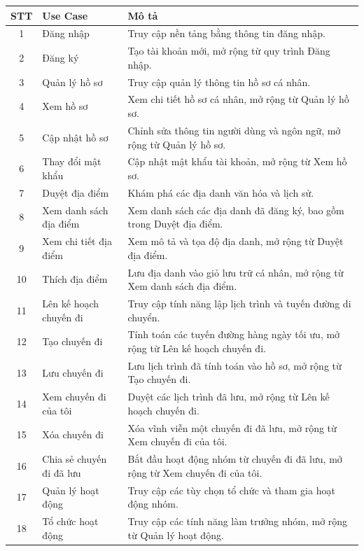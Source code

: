\documentclass[a4paper,12pt]{report}
\begin{document}
\newpage
\begin{table}[H]
\centering
\small
\renewcommand{\arraystretch}{1.1}
\begin{tabular}{|c|p{4.5cm}|p{9cm}|}
\hline
\textbf{STT} & \textbf{Use Case} & \textbf{Mô tả} \\ \hline
1 & Đăng nhập & Truy cập nền tảng bằng thông tin đăng nhập. \\ \hline
2 & Đăng ký & Tạo tài khoản mới, mở rộng từ quy trình Đăng nhập. \\ \hline
3 & Quản lý hồ sơ & Truy cập quản lý thông tin hồ sơ cá nhân. \\ \hline
4 & Xem hồ sơ & Xem chi tiết hồ sơ cá nhân, mở rộng từ Quản lý hồ sơ. \\ \hline
5 & Cập nhật hồ sơ & Chỉnh sửa thông tin người dùng và ngôn ngữ, mở rộng từ Quản lý hồ sơ. \\ \hline
6 & Thay đổi mật khẩu & Cập nhật mật khẩu tài khoản, mở rộng từ Xem hồ sơ. \\ \hline
7 & Duyệt địa điểm & Khám phá các địa danh văn hóa và lịch sử. \\ \hline
8 & Xem danh sách địa điểm & Xem danh sách các địa danh đã đăng ký, bao gồm trong Duyệt địa điểm. \\ \hline
9 & Xem chi tiết địa điểm & Xem mô tả và tọa độ địa danh, mở rộng từ Duyệt địa điểm. \\ \hline
10 & Thích địa điểm & Lưu địa danh vào giỏ lưu trữ cá nhân, mở rộng từ Xem danh sách địa điểm. \\ \hline
11 & Lên kế hoạch chuyến đi & Truy cập tính năng lập lịch trình và tuyến đường di chuyển. \\ \hline
12 & Tạo chuyến đi & Tính toán các tuyến đường hàng ngày tối ưu, mở rộng từ Lên kế hoạch chuyến đi. \\ \hline
13 & Lưu chuyến đi & Lưu lịch trình đã tính toán vào hồ sơ, mở rộng từ Tạo chuyến đi. \\ \hline
14 & Xem chuyến đi của tôi & Duyệt các lịch trình đã lưu, mở rộng từ Lên kế hoạch chuyến đi. \\ \hline
15 & Xóa chuyến đi & Xóa vĩnh viễn một chuyến đi đã lưu, mở rộng từ Xem chuyến đi của tôi. \\ \hline
16 & Chia sẻ chuyến đi đã lưu & Bắt đầu hoạt động nhóm từ chuyến đi đã lưu, mở rộng từ Xem chuyến đi của tôi. \\ \hline
17 & Quản lý hoạt động & Truy cập các tùy chọn tổ chức và tham gia hoạt động nhóm. \\ \hline
18 & Tổ chức hoạt động & Truy cập các tính năng làm trưởng nhóm, mở rộng từ Quản lý hoạt động. \\ \hline

\end{tabular}
\end{table}
\end{document}

